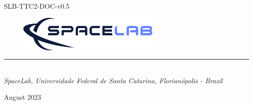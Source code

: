 %
%
%
%
%

%
%
%
%
%

\begin{titlepage}

\thispagestyle{empty}

\begin{flushleft}
SLB-TTC2-DOC-v0.5
\end{flushleft}

\vspace{1cm}

\begin{figure}[!ht]
    \begin{flushleft}
        \includegraphics[width=7cm]{figures/spacelab-logo-full-color-rgb-1000px@72ppi.png}
    \end{flushleft}
\end{figure}

\begin{flushleft}
\Huge{\textbf{\thetitle}}
\rule[0pt]{\textwidth}{5pt}
\end{flushleft}

\vspace{0.2cm}

\begin{flushleft}
\textit{\thetitle} \\
\textit{SpaceLab, Universidade Federal de Santa Catarina, Florianópolis - Brazil}
\end{flushleft}

\vfill
\vfill

\begin{flushright}
August 2023
\end{flushright}

\end{titlepage}
